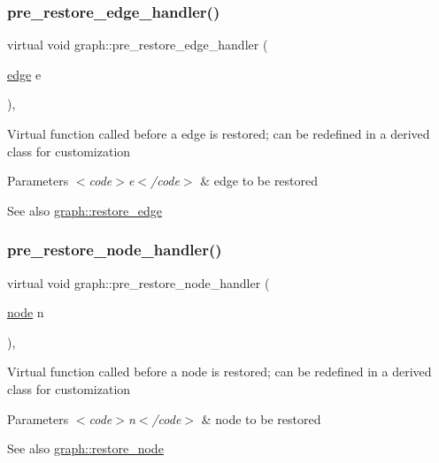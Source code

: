 \subsubsection{\texorpdfstring{pre\+\_\+restore\+\_\+edge\+\_\+handler()}{pre\_restore\_edge\_handler()}}
{\footnotesize\ttfamily virtual void graph\+::pre\+\_\+restore\+\_\+edge\+\_\+handler (\begin{DoxyParamCaption}\item[{\mbox{\hyperlink{classedge}{edge}}}]{e }\end{DoxyParamCaption})\hspace{0.3cm}{\ttfamily [inline]}, {\ttfamily [virtual]}}

Virtual function called before a edge is restored; can be redefined in a derived class for customization


\begin{DoxyParams}{Parameters}
{\em $<$code$>$e$<$/code$>$} & edge to be restored \\
\hline
\end{DoxyParams}
\begin{DoxySeeAlso}{See also}
\mbox{\hyperlink{classgraph_a2e5426682a0897b9f9104b019970bedc}{graph\+::restore\+\_\+edge}} 
\end{DoxySeeAlso}
\mbox{\label{classgraph_a7da481e2f363380343a68d52acc8473b}} 
\subsubsection{\texorpdfstring{pre\+\_\+restore\+\_\+node\+\_\+handler()}{pre\_restore\_node\_handler()}}
{\footnotesize\ttfamily virtual void graph\+::pre\+\_\+restore\+\_\+node\+\_\+handler (\begin{DoxyParamCaption}\item[{\mbox{\hyperlink{classnode}{node}}}]{n }\end{DoxyParamCaption})\hspace{0.3cm}{\ttfamily [inline]}, {\ttfamily [virtual]}}

Virtual function called before a node is restored; can be redefined in a derived class for customization


\begin{DoxyParams}{Parameters}
{\em $<$code$>$n$<$/code$>$} & node to be restored \\
\hline
\end{DoxyParams}
\begin{DoxySeeAlso}{See also}
\mbox{\hyperlink{classgraph_ab57aab79e649cc275052b7decbdd03ec}{graph\+::restore\+\_\+node}} 
\end{DoxySeeAlso}
\mbox{\label{classgraph_a2e5426682a0897b9f9104b019970bedc}} 
